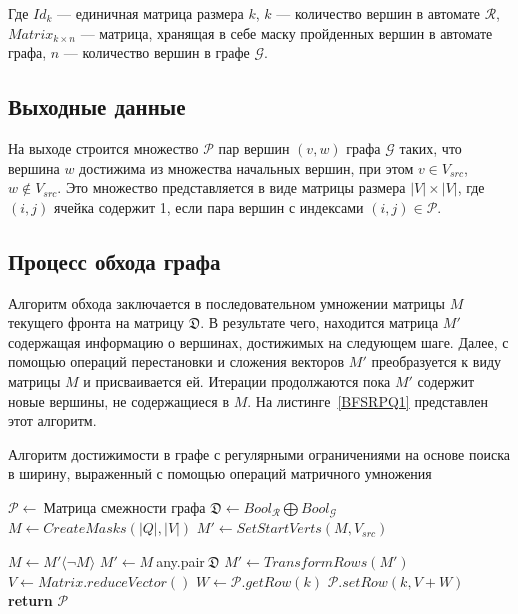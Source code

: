 Где $Id_k$ --- единичная матрица размера $k$, $k$ --- количество вершин в автомате $\mathcal{R}$, $Matrix_{k \times n }$ --- матрица, хранящая в себе маску пройденных вершин в автомате графа, $n$ --- количество вершин в графе $\mathcal{G}$.

\subsection{Выходные данные}

На выходе строится множество $\mathcal{P}$ пар вершин $(v, w)$ графа $\mathcal{G}$ таких, что вершина $w$ достижима из множества начальных вершин, при этом $v \in V_{src}$, $w \not\in V_{src}$. Это множество представляется в виде матрицы размера $|V|\times|V|$, где $(i,j)$ ячейка содержит 1, если пара вершин с индексами $(i, j) \in \mathcal{P}$.

\subsection{Процесс обхода графа}

Алгоритм обхода заключается в последовательном умножении матрицы $M$ текущего фронта на матрицу $\mathfrak{D}$. В результате чего, находится матрица $M'$ содержащая информацию о вершинах, достижимых на следующем шаге. Далее, с помощью операций перестановки и сложения векторов $M'$ преобразуется к виду матрицы $M$ и присваивается ей. Итерации продолжаются пока $M'$ содержит новые вершины, не содержащиеся в $M$. На листинге~\ref{BFSRPQ1} представлен этот алгоритм.

\begin{algorithm}[t]
  \caption{Алгоритм достижимости в графе с регулярными ограничениями на основе поиска в ширину, выраженный с помощью операций матричного умножения}\label{BFSRPQ1}
  \begin{algorithmic}[1]
    \State $\mathcal{P}\gets~${Матрица смежности графа}
    \State $\mathfrak{D}\gets Bool_\mathcal{R} \bigoplus Bool_\mathcal{G}$
    \State $M\gets CreateMasks(|Q|,|V|)$ 
    \State $M'\gets SetStartVerts(M, V_{src})$  
    
      \State $M\gets M'\langle\neg M\rangle$
        \State $M'\gets M~$any.pair$~\mathfrak{D}$
        \State $M'\gets TransformRows(M')$\label{TransformRows}
      \EndFor
        \State $V\gets Matrix.reduceVector()$ 
            \State $W\gets\mathcal{P}.getRow(k)$
            \State $\mathcal{P}.setRow(k, V+W)$
      \EndFor
    \EndWhile
    \State \textbf{return} $\mathcal{P}$
    \EndProcedure
  \end{algorithmic}
\end{algorithm}

